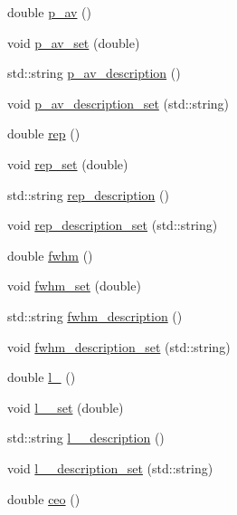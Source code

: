 \begin{DoxyCompactItemize}
\item 
double \hyperlink{class_config___settings_a6521140a63ae986c9b22990dbc1fa9e7}{p\+\_\+av} ()
\item 
void \hyperlink{class_config___settings_a27c9ab85962783bdda359b69f63f1675}{p\+\_\+av\+\_\+set} (double)
\item 
std\+::string \hyperlink{class_config___settings_a060392ef2b0c4b13ff9c865af0e6060f}{p\+\_\+av\+\_\+description} ()
\item 
void \hyperlink{class_config___settings_a4f063c2d01f4b85865666953cc6c0bfb}{p\+\_\+av\+\_\+description\+\_\+set} (std\+::string)
\item 
double \hyperlink{class_config___settings_a2d7cd824c2d98ef18359a062a802dca5}{rep} ()
\item 
void \hyperlink{class_config___settings_a190867ecfbe068e79f3cfe95947423d1}{rep\+\_\+set} (double)
\item 
std\+::string \hyperlink{class_config___settings_a7ed33a5b7a724d356ff374017f31d94b}{rep\+\_\+description} ()
\item 
void \hyperlink{class_config___settings_af0b5006b967b95f83ff5f793d8b5b949}{rep\+\_\+description\+\_\+set} (std\+::string)
\item 
double \hyperlink{class_config___settings_abb82d61227a72fcf9fb09a8b53ed978f}{fwhm} ()
\item 
void \hyperlink{class_config___settings_affdb0e9eaac7137b78615eacb84a1527}{fwhm\+\_\+set} (double)
\item 
std\+::string \hyperlink{class_config___settings_adc823fae380105489fc516592cf6ec5f}{fwhm\+\_\+description} ()
\item 
void \hyperlink{class_config___settings_a056a2a568c405b96efd5ff0a9ee10161}{fwhm\+\_\+description\+\_\+set} (std\+::string)
\item 
double \hyperlink{class_config___settings_a42be7e23a13a58de4f33f4f0a7ff420a}{l\+\_} ()
\item 
void \hyperlink{class_config___settings_a0e6a1ad74cd5ef799383623316ef293d}{l\+\_\+\_\+set} (double)
\item 
std\+::string \hyperlink{class_config___settings_a3757b7cd606c810059079437075245b9}{l\+\_\+\_\+description} ()
\item 
void \hyperlink{class_config___settings_a1be31eb27a929d913838c85d35abed7d}{l\+\_\+\_\+description\+\_\+set} (std\+::string)
\item 
double \hyperlink{class_config___settings_ae8c68e62cdb5567405e82a77ae822ed1}{ceo} ()
\item 

\end{DoxyCompactItemize}
